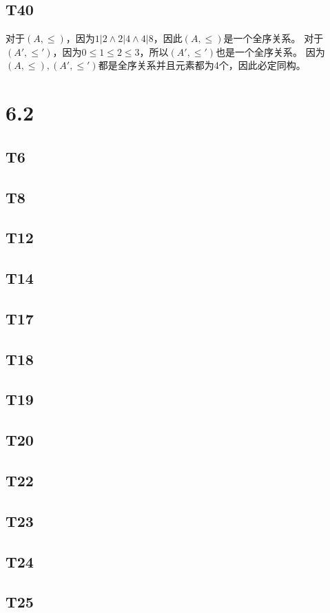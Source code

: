 \documentclass{article}
\begin{document}
\subsection{T40}
对于$(A, \leq)$，因为$1 | 2 \land 2 | 4 \land 4 | 8$，因此$(A, \leq)$是一个全序关系。
对于$(A', \leq')$，因为$0 \leq 1 \leq 2 \leq 3$，所以$(A', \leq')$也是一个全序关系。
因为$(A, \leq),(A', \leq')$都是全序关系并且元素都为4个，因此必定同构。
\section{6.2}
\subsection{T6}
\subsection{T8}
\subsection{T12}
\subsection{T14}
\subsection{T17}
\subsection{T18}
\subsection{T19}
\subsection{T20}
\subsection{T22}
\subsection{T23}
\subsection{T24}
\subsection{T25}
\end{document}
